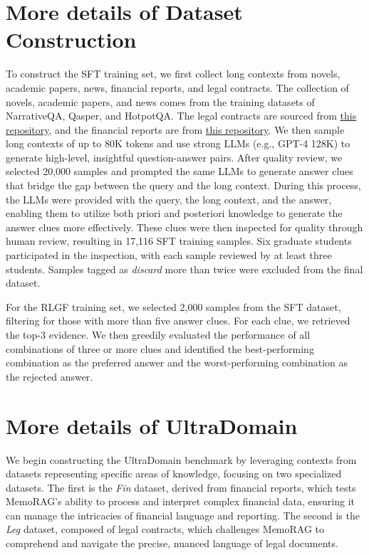\documentclass[sigconf]{acmart}
\begin{document}
\section{More details of Dataset Construction}
\label{sec:data_detail}
To construct the SFT training set, we first collect long contexts from novels, academic papers, news, financial reports, and legal contracts. The collection of novels, academic papers, and news comes from the training datasets of NarrativeQA, Qasper, and HotpotQA. The legal contracts are sourced from \href{https://huggingface.co/datasets/albertvillanova/legal_contracts/tree/main}{this repository}, and the financial reports are from \href{https://huggingface.co/datasets/albertvillanova/legal_contracts/tree/main}{this repository}. We then sample long contexts of up to 80K tokens and use strong LLMs (e.g., GPT-4 128K) to generate high-level, insightful question-answer pairs. After quality review, we selected 20,000 samples and prompted the same LLMs to generate answer clues that bridge the gap between the query and the long context. During this process, the LLMs were provided with the query, the long context, and the answer, enabling them to utilize both priori and posteriori knowledge to generate the answer clues more effectively. These clues were then inspected for quality through human review, resulting in 17,116 SFT training samples. Six graduate students participated in the inspection, with each sample reviewed by at least three students. Samples tagged as \textit{discard} more than twice were excluded from the final dataset.

For the RLGF training set, we selected 2,000 samples from the SFT dataset, filtering for those with more than five answer clues. For each clue, we retrieved the top-3 evidence. We then greedily evaluated the performance of all combinations of three or more clues and identified the best-performing combination as the preferred answer and the worst-performing combination as the rejected answer.



\section{More details of UltraDomain}
\label{sec:ultra}
We begin constructing the UltraDomain benchmark by leveraging contexts from datasets representing specific areas of knowledge, focusing on two specialized datasets. The first is the \textit{Fin} dataset, derived from financial reports, which tests MemoRAG's ability to process and interpret complex financial data, ensuring it can manage the intricacies of financial language and reporting. The second is the \textit{Leg} dataset, composed of legal contracts, which challenges MemoRAG to comprehend and navigate the precise, nuanced language of legal documents.
\end{document}
